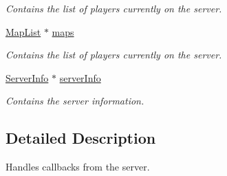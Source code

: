 \begin{DoxyCompactItemize}
\begin{DoxyCompactList}\small\item\em Contains the list of players currently on the server. \end{DoxyCompactList}\item 
\hypertarget{classCallBackManager_a4b3c557fca85e1ba8ab292fc9df3da7c}{\hyperlink{classMapList}{Map\-List} $\ast$ \hyperlink{classCallBackManager_a4b3c557fca85e1ba8ab292fc9df3da7c}{maps}}\label{classCallBackManager_a4b3c557fca85e1ba8ab292fc9df3da7c}

\begin{DoxyCompactList}\small\item\em Contains the list of players currently on the server. \end{DoxyCompactList}\item 
\hypertarget{classCallBackManager_aed9d56d611bfcbc282f6c99f5b8408a2}{\hyperlink{structServerInfo}{Server\-Info} $\ast$ \hyperlink{classCallBackManager_aed9d56d611bfcbc282f6c99f5b8408a2}{server\-Info}}\label{classCallBackManager_aed9d56d611bfcbc282f6c99f5b8408a2}

\begin{DoxyCompactList}\small\item\em Contains the server information. \end{DoxyCompactList}\end{DoxyCompactItemize}


\subsection{Detailed Description}
Handles callbacks from the server. 

